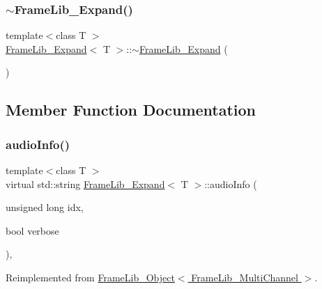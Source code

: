 \subsubsection{\texorpdfstring{$\sim$\+Frame\+Lib\+\_\+\+Expand()}{~FrameLib\_Expand()}}
{\footnotesize\ttfamily template$<$class T $>$ \\
\hyperlink{class_frame_lib___expand}{Frame\+Lib\+\_\+\+Expand}$<$ T $>$\+::$\sim$\hyperlink{class_frame_lib___expand}{Frame\+Lib\+\_\+\+Expand} (\begin{DoxyParamCaption}{ }\end{DoxyParamCaption})\hspace{0.3cm}{\ttfamily [inline]}}



\subsection{Member Function Documentation}
\mbox{\label{class_frame_lib___expand_a94ab97ff114452551719fad428fd2d6e}} 
\subsubsection{\texorpdfstring{audio\+Info()}{audioInfo()}}
{\footnotesize\ttfamily template$<$class T $>$ \\
virtual std\+::string \hyperlink{class_frame_lib___expand}{Frame\+Lib\+\_\+\+Expand}$<$ T $>$\+::audio\+Info (\begin{DoxyParamCaption}\item[{unsigned long}]{idx,  }\item[{bool}]{verbose }\end{DoxyParamCaption})\hspace{0.3cm}{\ttfamily [inline]}, {\ttfamily [virtual]}}



Reimplemented from \hyperlink{class_frame_lib___object_af618fcdec82b457911147c7c293bedd7}{Frame\+Lib\+\_\+\+Object$<$ Frame\+Lib\+\_\+\+Multi\+Channel $>$}.

\mbox{\label{class_frame_lib___expand_ab3f908391944bd2d6f5492cc67c19cba}} 
